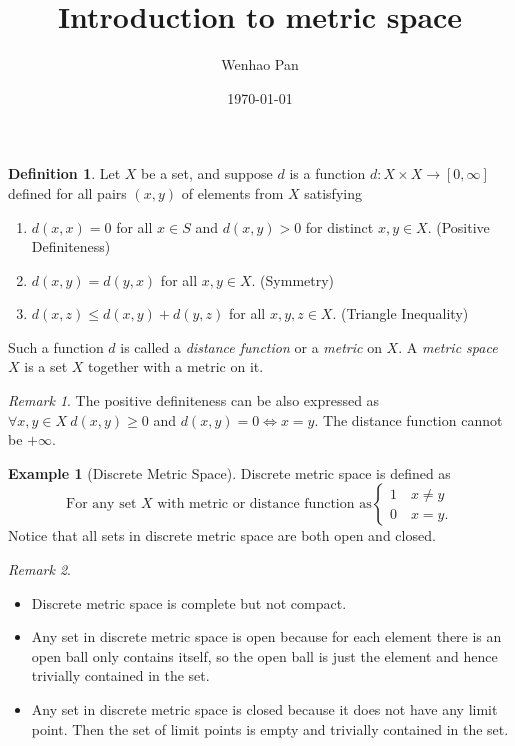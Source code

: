 \documentclass[12pt, lettersize]{article}
\title{Introduction to metric space}
\author{Wenhao Pan}
\date{\today}
\theoremstyle{plain}
\theoremstyle{definition}
\newtheorem{dfn}[thm]{Definition}
\newtheorem*{eg}{Example}
\theoremstyle{remark}
\newtheorem*{rem}{Remark}
\begin{document}
\maketitle

\begin{dfn}
	Let $X$ be a set, and suppose $d$ is a function $d: X\times X\rightarrow[0,\infty]$ defined for all pairs $(x,y)$ of elements from $X$ satisfying
	\begin{enumerate}
		\item $d(x,x)=0$ for all $x\in S$ and $d(x,y)>0$ for distinct $x,y\in X$. (Positive Definiteness)
		\item $d(x,y)=d(y,x)$ for all $x,y\in X$. (Symmetry)
		\item $d(x,z)\leq d(x,y)+d(y,z)$ for all $x,y,z\in X$. (Triangle Inequality)
	\end{enumerate}
	Such a function $d$ is called a \emph{distance function} or a \emph{metric} on $X$. A \emph{metric space} $X$ is a set $X$ together with a metric on it.
\end{dfn}
\begin{rem}
	The positive definiteness can be also expressed as $\forall x,y\in X\ d(x,y)\geq 0$ and $d(x,y)=0\iff x=y$. The distance function cannot be $+\infty$.
\end{rem}
\begin{eg}[Discrete Metric Space]
	Discrete metric space is defined as
	\begin{displaymath}
		\text{For any set $X$ with metric or distance function as}\begin{cases}
			1\quad\text{$x\neq y$}\\ 0\quad\text{$x=y$}.
		\end{cases}
	\end{displaymath}
	Notice that all sets in discrete metric space are both open and closed.
\end{eg}
\begin{rem}
\begin{itemize}
	\item Discrete metric space is complete but not compact.
	\item Any set in discrete metric space is open because for each element there is an open ball only contains itself, so the open ball is just the element and hence trivially contained in the set.
	\item Any set in discrete metric space is closed because it does not have any limit point. Then the set of limit points is empty and trivially contained in the set.
\end{itemize}
\end{rem}
\end{document}
